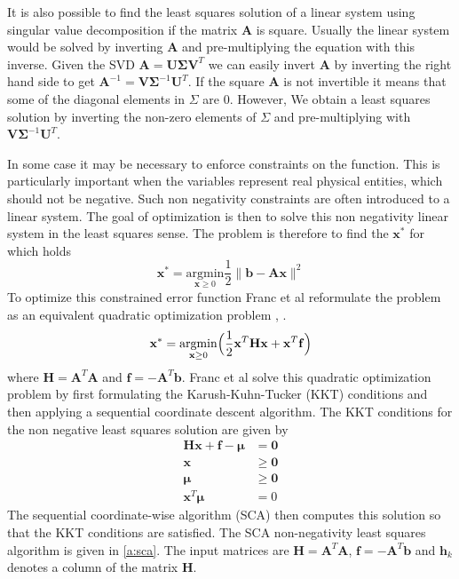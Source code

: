 \documentclass[11pt,a4paper,twoside]{report}
\begin{document}
It is also possible to find the least squares solution of a linear system using
singular value decomposition \cite{Press1992} if the matrix $\mathbf{A}$ is square. Usually the linear system would
be solved by inverting $\mathbf{A}$ and pre-multiplying the equation with this
inverse. Given the SVD $\mathbf{A} = \mathbf{U\Sigma V}^T$ we can easily invert
$\mathbf{A}$ by inverting the right hand side to get $\mathbf{A}^{-1} =
\mathbf{V\Sigma}^{-1}\mathbf{U}^T$. If the square $\mathbf{A}$ is not invertible it
means that some of the diagonal elements in $\Sigma$ are 0. However, We obtain a
least squares solution by inverting the non-zero elements of $\Sigma$ and
pre-multiplying with $\mathbf{V\Sigma}^{-1}\mathbf{U}^T$.

In some case it may be necessary to enforce constraints on the function. This is
particularly important when the variables represent real physical entities,
which should not be negative. Such non negativity constraints are often
introduced to a linear system. The goal of optimization is then to solve this
non negativity linear system in the least squares sense. The problem is
therefore to find the $\mathbf{x^*}$ for which holds
\begin{equation}\label{eq:nnls3}
\mathbf{x^*} = \underset{\mathbf{x} \ge 0}{\mathrm{argmin}} \frac{1}{2}\lVert \mathbf{b} - \mathbf{Ax} \rVert^2
\end{equation}
To optimize this constrained error function Franc et al reformulate the problem as an equivalent
quadratic optimization problem \cite{nnls}, \cite{nnls2}. 
\begin{equation}\label{eq:nnls4}
\mathbf{x^*} =  \underset{\mathbf{x} \ge 0}{\mathrm{argmin}} \Bigr( \frac{1}{2}
\mathbf{x}^T\mathbf{H}\mathbf{x} + \mathbf{x}^T\mathbf{f} \Bigl)
\end{equation}
where $\mathbf{H} = \mathbf{A}^T\mathbf{A}$ and $\mathbf{f} = -\mathbf{A}^T\mathbf{b}$.
Franc et al solve this quadratic optimization problem by first formulating the Karush-Kuhn-Tucker (KKT) conditions
and then applying a sequential coordinate descent algorithm. The KKT conditions for the non negative least squares solution are
given by
\begin{align}\label{eq:nnls5}
\mathbf{H}\mathbf{x} + \mathbf{f} - \mathbf{\mu} &= \mathbf{0}\\
\mathbf{x} &\ge \mathbf{0}\\
\mathbf{\mu} &\ge \mathbf{0}\\
\mathbf{x}^T\mathbf{\mu} &= 0
\end{align}
The sequential coordinate-wise algorithm (SCA) then computes this solution so that the
KKT conditions are satisfied. The SCA non-negativity least squares algorithm is
given in \ref{a:sca}. The input matrices are  $\mathbf{H} =
\mathbf{A}^T\mathbf{A}$, $\mathbf{f} = -\mathbf{A}^T\mathbf{b}$ and
$\mathbf{h}_k$ denotes a column of the matrix $\mathbf{H}$. 
\end{document}
